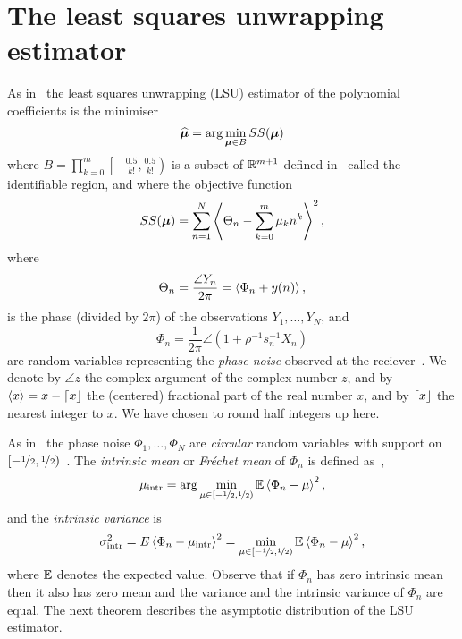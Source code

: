 \documentclass[journal]{IEEEtran}
\begin{document}
\section{The least squares unwrapping estimator}\label{sec:least-squar-unwr}

As in~\cite{McKilliam_pps1_2012} the least squares unwrapping (LSU) estimator of the polynomial coefficients is the minimiser
\begin{equation}\label{eq:hatmubfLSUdefn}
\widehat{\mubf} = \arg \min_{\mubf \in B} SS(\mubf)
\end{equation}
where $B = \prod_{k=0}^{m}\left[ -\frac{0.5}{k!}, \frac{0.5}{k!}  \right)$ is a subset of ${\mathbb R}^{m+1}$ defined in~\cite[Sec.~3]{McKilliam_pps1_2012} called the identifiable region, and where the objective function
\begin{equation} \label{eq:sumofsquaresfunction}
SS(\mubf) = \sum_{n=1}^{N}\fracpart{  \Theta_{n} - \sum_{k = 0}^{m}{\mu_k n^k} }^{2},
\end{equation}
where
\begin{equation}\label{eq:noise_circ_poly}
\Theta_n = \frac{\angle{Y_n}}{2\pi} = \fracpart{ \Phi_n + y(n) },
\end{equation}
is the phase (divided by $2\pi$) of the observations $Y_1,\dots,Y_N$, and
\[
\Phi_n = \frac{1}{2\pi}\angle(1 + \rho^{-1}s_n^{-1}X_n)
\] 
are random variables representing the \emph{phase noise} observed at the reciever~\cite{Tretter1985}.  We denote by $\angle{z}$ the complex argument of the complex number $z$, and by $\left\langle x \right\rangle = x - {\left\lceil x \right\rfloor}$ the (centered) fractional part of the real number $x$, and by ${\left\lceil x \right\rfloor}$ the nearest integer to $x$.  We have chosen to round half integers up here.

As in~\cite[Sec.~4]{McKilliam_pps1_2012} the phase noise $\Phi_1,\dots,\Phi_N$ are \emph{circular} random variables with support on $[-\nicefrac{1}{2}, \nicefrac{1}{2})$~\cite{McKilliam2010thesis,McKilliam_mean_dir_est_sq_arc_length2010,Mardia_directional_statistics,Fisher1993}.  The \emph{intrinsic mean} or \emph{Fr\'{e}chet mean} of $\Phi_n$ is defined as~\cite{McKilliam_mean_dir_est_sq_arc_length2010,bwhk07a,Bhattacharya_int_ext_means_2003,Bhattacharya_int_ext_means_2005},
\begin{equation}\label{eq:intrmeandefn}
 \mu_{\text{intr}}  = \arg \min_{\mu \in [-\nicefrac{1}{2}, \nicefrac{1}{2})} \expect \fracpart{\Phi_n - \mu}^2, 
\end{equation}
and the \emph{intrinsic variance} is
\[
\sigma_{\text{intr}}^2 = E\left\langle \Phi_n - \mu_{\text{intr}} \right\rangle^2 = \min_{\mu \in [-\nicefrac{1}{2}, \nicefrac{1}{2})} {\mathbb E} \left\langle \Phi_n - \mu \right\rangle^2,
\]
where ${\mathbb E}$ denotes the expected value.  Observe that if $\Phi_n$ has zero intrinsic mean then it also has zero mean and the variance and the intrinsic variance of $\Phi_n$ are equal.  The next theorem describes the asymptotic distribution of the LSU estimator.
\end{document}
